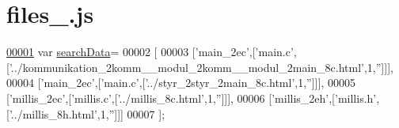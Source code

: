 \hypertarget{files__4_8js_source}{}\section{files\+\_.\+js}
\label{files__4_8js_source}

\begin{DoxyCode}
\hypertarget{files__4_8js_source.tex_l00001}{}\hyperlink{files__4_8js_ad01a7523f103d6242ef9b0451861231e}{00001} var \hyperlink{files__4_8js_ad01a7523f103d6242ef9b0451861231e}{searchData}=
00002 [
00003   [\textcolor{stringliteral}{'main\_2ec'},[\textcolor{stringliteral}{'main.c'},[\textcolor{stringliteral}{'../kommunikation\_2komm\_\_modul\_2komm\_\_modul\_2main\_8c.html'},1,\textcolor{stringliteral}{''}]]],
00004   [\textcolor{stringliteral}{'main\_2ec'},[\textcolor{stringliteral}{'main.c'},[\textcolor{stringliteral}{'../styr\_2styr\_2main\_8c.html'},1,\textcolor{stringliteral}{''}]]],
00005   [\textcolor{stringliteral}{'millis\_2ec'},[\textcolor{stringliteral}{'millis.c'},[\textcolor{stringliteral}{'../millis\_8c.html'},1,\textcolor{stringliteral}{''}]]],
00006   [\textcolor{stringliteral}{'millis\_2eh'},[\textcolor{stringliteral}{'millis.h'},[\textcolor{stringliteral}{'../millis\_8h.html'},1,\textcolor{stringliteral}{''}]]]
00007 ];
\end{DoxyCode}
